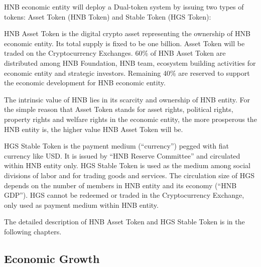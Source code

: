 \documentclass[fleqn,10pt]{SelfArx} %
\begin{document}
HNB economic entity will deploy a Dual-token system by issuing two types of tokens: Asset Token (HNB Token) and Stable Token (HGS Token): \\


HNB Asset Token is the digital crypto asset representing the ownership of HNB economic entity. Its total supply is fixed to be one billion. Asset Token will be traded on the Cryptocurrency Exchanges. 60\% of HNB Asset Token are distributed among HNB Foundation, HNB team, ecosystem building activities for economic entity and strategic investors. Remaining 40\% are reserved to support the economic development for HNB economic entity.

The intrinsic value of HNB lies in its scarcity and ownership of HNB entity.  For the simple reason that Asset Token stands for asset rights, political rights, property rights and welfare rights in the economic entity, the more prosperous the HNB entity is, the higher value HNB Asset Token will be.\\


HGS Stable Token is the payment medium (“currency”) pegged with fiat currency like USD. It is issued by “HNB Reserve Committee” and circulated within HNB entity only. HGS Stable Token is used as the medium among social divisions of labor and for trading goods and services. The circulation size of HGS depends on the number of members in HNB entity and its economy (“HNB GDP”). HGS cannot be redeemed or traded in the Cryptocurrency Exchange, only used as payment medium within HNB entity. 

The detailed description of HNB Asset Token and HGS Stable Token is in the following chapters. \\




\subsection{Economic Growth}
\end{document}
